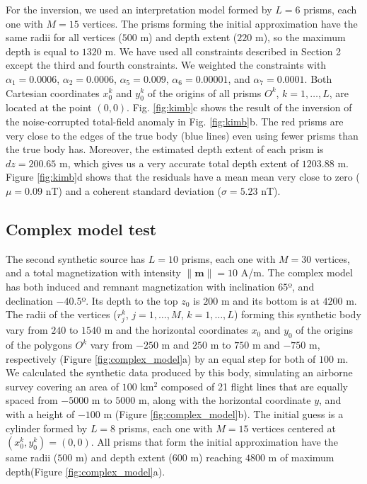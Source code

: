 For the inversion, we used an interpretation model formed by $L=6$ prisms, each one with $M=15$ vertices. The prisms forming the initial approximation have the same radii for all vertices ($500$ m) and depth extent ($220$ m), so the maximum depth is equal to $1320$ m. We have used all constraints described in Section 2 except the third and fourth constraints. We weighted the constraints with $\alpha_1 = 0.0006$, $\alpha_2 = 0.0006$, $\alpha_5 = 0.009$, $\alpha_6 = 0.00001$, and $\alpha_7 = 0.0001$. Both Cartesian coordinates $x_0^k$ and $y_0^k$ of the origins of all prisms $O^k$, $k=1,\dots,L$, are located at the point $(0,0)$. Fig. \ref{fig:kimb}c shows the result of the inversion of the noise-corrupted total-field anomaly in Fig. \ref{fig:kimb}b. The red prisms are very close to the edges of the true body (blue lines) even using fewer prisms than the true body has. Moreover, the estimated depth extent of each prism is $dz = 200.65$ m, which gives us a very accurate total depth extent of $1203.88$ m. Figure \ref{fig:kimb}d shows that the residuals have a mean mean very close to zero ($\mu=0.09$ nT) and a coherent standard deviation ($\sigma=5.23$ nT).



\subsection{Complex model test}

The second synthetic source has $L=10$ prisms, each one with $M=30$ vertices, and a total magnetization with intensity $\|\mathbf{m}\| =10$ A/m. The complex model has both induced and remnant magnetization with inclination $65$º, and declination $-40.5$º. Its depth to the top $z_0$ is $200$ m and its bottom is at $4200$ m. The radii of the vertices ($r_j^k$, $j=1,\dots,M$, $k=1,\dots,L$) forming this synthetic body vary from $240$ to $1540$ m and the horizontal coordinates $x_0$ and $y_0$ of the origins of the polygons $O^k$ vary from $-250$ m and $250$ m to $750$ m and $-750$ m, respectively (Figure \ref{fig:complex_model}a) by an equal step for both of $100$ m. We calculated the synthetic data produced by this body, simulating an airborne survey covering an area of $100$ km$^2$ composed of 21 flight lines that are equally spaced from $-5000$ m to $5000$ m, along with the horizontal coordinate $y$, and with a height of $-100$ m (Figure \ref{fig:complex_model}b). The initial guess is a cylinder formed by $L=8$ prisms, each one with $M=15$ vertices centered at $(x_0^k, y_0^k) = (0,0)$. All prisms that form the initial approximation have the same radii ($500$ m) and depth extent ($600$ m) reaching $4800$ m of maximum depth(Figure \ref{fig:complex_model}a).

